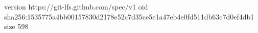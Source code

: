 version https://git-lfs.github.com/spec/v1
oid sha256:1535775a4bb00157830d2178e52c7d35ce5e1a47eb4e0fd511db63c7d0ef4db1
size 598
